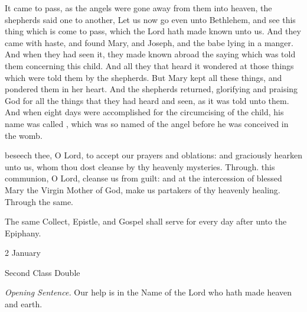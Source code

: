  It came to pass, as the angels were gone away from them into heaven, the shepherds said one to another, Let us now go even unto Bethlehem, and see this thing which is come to pass, which the Lord hath made known unto us. And they came with haste, and found Mary, and Joseph, and the babe lying in a manger. And when they had seen it, they made known abroad the saying which was told them concerning this child. And all they that heard it wondered at those things which were told them by the shepherds. But Mary kept all these things, and pondered them in her heart. And the shepherds returned, glorifying and praising God for all the things that they had heard and seen, as it was told unto them. And when eight days were accomplished for the circumcising of the child, his name was called , which was so named of the angel before he was conceived in the womb.

\secret
{} beseech thee, O Lord, to accept our prayers and oblations: and graciously hearken unto us, whom thou dost cleanse by thy heavenly mysteries. Through.
\postcommunion
{} this communion, O Lord, cleanse us from guilt: and at the intercession of blessed Mary the Virgin Mother of God, make us partakers of thy heavenly healing. Through the same.

\begin{rubric}
    The same Collect, Epistle, and Gospel shall serve for every day after unto the Epiphany.
\end{rubric}

\label{MostHolyName}
\begin{inhead}
{2 January}\par
{Second Class Double}
\end{inhead}
\par\noindent
\textit{Opening Sentence.} Our help is in the Name of the Lord who hath made heaven and earth.

